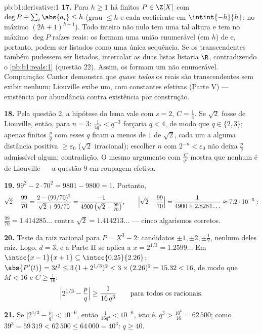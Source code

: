 \begin{solution}{pb:b1:derivative:1}
\textbf{17.} Para $h \geq 1$ há finitos $P \in
\Z[X]$ com $\deg P + \sum_i \abs{a_i} \leq h$ (grau $\leq h$
e cada coeficiente em $\intint{-h}{h}$: no máximo
$(2h+1)^{h+1}$). Todo  inteiro não nulo tem uma tal
altura e tem no máximo $\deg P$ raízes reais: os  formam uma união enumerável (em $h$) de  e,
portanto, podem ser listados como uma única sequência. Se os
transcendentes também pudessem ser listados, intercalar as duas listas
listaria $\R$, contradizendo o \cref{pb:b1:reals:1} (questão 22). Assim,
os  formam um  não enumerável.
Comparação: Cantor demonstra que \emph{quase todos} os reais são
transcendentes sem exibir nenhum; Liouville exibe um, com constantes
efetivas (Parte V) --- existência por abundância contra existência por
construção.

\textbf{18.} Pela questão 2, a hipótese do lema vale com $s
= 2$, $C = \frac14$. Se $\sqrt2$ fosse de Liouville, então, para $n =
3$: $\frac{1}{4q^2} < q^{-3}$ forçaria $q < 4$, de modo que $q \in \{2,
3\}$; apenas finitos $\frac pq$ com esses $q$ ficam a menos de
$1$ de $\sqrt2$, cada um a alguma distância positiva
$\geq \varepsilon_0$ ($\sqrt2$ irracional); escolher $n$ com
$2^{-n} < \varepsilon_0$ não deixa $\frac pq$ admissível algum:
contradição. O mesmo argumento com $\frac{C}{q^d}$ mostra que nenhum
 é de Liouville --- a questão 9 em roupagem
efetiva.

\textbf{19.} $99^2 - 2\cdot70^2 = 9801 - 9800 = 1$. Portanto,
\[
\sqrt2 - \frac{99}{70} =
\frac{2 - (99/70)^2}{\sqrt2 + 99/70}
= \frac{-1}{4900\,\bigl(\sqrt2 + \tfrac{99}{70}\bigr)} ,
\qquad
\Bigl|\sqrt2 - \frac{99}{70}\Bigr|
= \frac{1}{4900 \times 2.8284\dots} \approx 7.2\cdot10^{-5} :
\]
$\frac{99}{70} = 1.414285\dots$ contra $\sqrt2 =
1.414213\dots$ --- cinco algarismos corretos.

\textbf{20.} Teste da raiz racional para $P = X^3 - 2$: candidatos
$\pm1, \pm2, \pm\frac12$, nenhum deles raiz. Logo, $d = 3$, e a Parte II
se aplica a $x = 2^{1/3} = 1.2599\dots$ Em $\intcc{x - 1}{x + 1}
\subseteq \intcc{0.25}{2.26}$: $\abs{P'(t)} = 3t^2 \leq 3\,(1 +
2^{1/3})^2 < 3\times(2.26)^2 = 15.32 < 16$, de modo que $M < 16$ e $C
\geq \frac{1}{16}$:
\[
\Bigl|2^{1/3} - \frac pq\Bigr| \geq \frac{1}{16\,q^3}
\qquad\text{para todos os racionais.}
\]

\textbf{21.} Se $\bigl|2^{1/3} - \frac pq\bigr| < 10^{-6}$, então
$\frac{1}{16 q^3} < 10^{-6}$, isto é, $q^3 > \frac{10^6}{16} =
62\,500$; como $39^3 = 59\,319 < 62\,500 \leq 64\,000 = 40^3$:
$q \geq 40$.


\end{solution}
